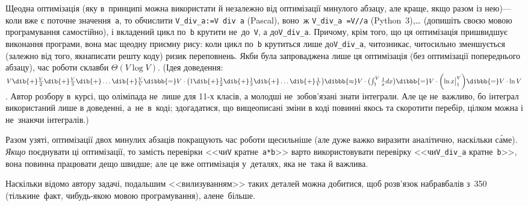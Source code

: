 Ще\nolinebreak[3] одна оптимізація (яку в~принципі можна використати й незалежно від оптимізації минулого абзацу, але краще, якщо разом із нею)\nolinebreak[3] --- коли вже є поточне значення~\texttt{a}, то обчислити 
\texttt{V\_div\_a:=\nolinebreak[3]\mbox{V div a}} (Pascal), воно~ж 
\texttt{V\_div\_a~=\nolinebreak[3] \mbox{V//a}} (Python~3),\nolinebreak[2] \dots 
(допишіть своєю мовою програмування самостійно), 
і вкладений цикл по~\texttt{b} крутити не~до~\texttt{V}, а до\nolinebreak[3] \texttt{V\_div\_a}. 
Причому, крім того, що ця оптимізація пришвидшує виконання програми, вона має ще\nolinebreak[3] одну приємну рису: коли цикл по~\texttt{b} крутиться лише до\nolinebreak[3] \texttt{V\_div\_a}, чи\nolinebreak[3] то\nolinebreak[3] зникає, чи\nolinebreak[3] то\nolinebreak[3] сильно зменшується (залежно від того, як\nolinebreak[3] написати решту коду) ризик переповнень.
Якби була запроваджена лише ця оптимізація (без оптимізації попереднього абзацу), час роботи склав\nolinebreak[3] би $\Theta(V\log{}V)$. (Ідея доведення: $V\dib{{+}}\frac{V}{2}\dib{{+}}\frac{V}{3}\dib{{+}}\ldots\dib{{+}}\frac{V}{V}\dibbb{{=}}V\cdot\bigl(1\dib{{+}}\frac{1}{2}\dib{{+}}\frac{1}{3}\dib{{+}}\ldots\dib{{+}}\frac{1}{V}\bigr)\dibbb{{\approx}}V\cdot\bigl(\int\nolimits_{1}^{V}{\frac{1}{x}dx}\bigr)\dibbb{{=}}V\cdot\biggl(\bigl.\ln x\bigr|_{1}^{V}\biggr)\dibbb{{=}}V\cdot\ln{}V$. Автор розбору в~курсі, що оліміпада не~лише для \mbox{11-х} класів, а молодші не~зобов'язані знати інтеграли. Але це не~важливо, бо інтеграл використаний лише в доведенні, а~не~в~коді; здогадатися, що вищеописані зміни в коді повинні якось та скоротити перебір, цілком можна і не~знаючи інтегралів.)

Разом узяті, оптимізації двох минулих абзаців покращують час роботи ще\nolinebreak[3] сильніше (але дуже важко виразити аналітично, наскільки с\'{а}ме). 
\emph{Якщо} поєднувати ці оптимізації, то замість перевірки <<чи\nolinebreak[3] \texttt{V} кратне~\texttt{a*b}>> варто використовувати перевірку <<чи\nolinebreak[3] \texttt{V\_div\_a} кратне~\texttt{b}>>, вона повинна працювати дещо швидше; але це вже оптимізація у~деталях, яка не~така й важлива.

Наскільки відомо автору задачі, подальшим <<вилизуванням>> таких деталей можна добитися, щоб розв'язок 
набрав\nolinebreak[3] балів з~350 (тільки\nolinebreak[2] не~факт, чи\nolinebreak[3] будь-якою мовою програмування), 
але\nolinebreak[3] не~більше.


